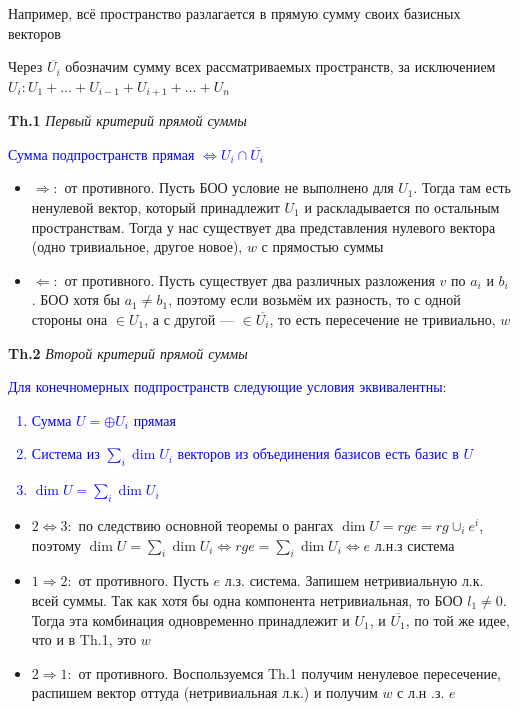 Например, всё пространство разлагается в прямую сумму своих базисных векторов

Через $\overline{U_i}$ обозначим сумму всех рассматриваемых пространств, за исключением $U_i: U_1 + \dots + U_{i-1} +
U_{i+1} + \dots + U_n$

\textbf{Th.1} \textit{Первый критерий прямой суммы}

\textcolor{blue}{Сумма подпространств прямая $\Leftrightarrow U_i \cap \overline{U_i}$}

\begin{itemize}
    \item $\Rightarrow:$ от противного.
    Пусть БОО условие не выполнено для $U_1$.
    Тогда там есть ненулевой вектор, который принадлежит $U_1$ и раскладывается по остальным пространствам.
    Тогда у нас существует два представления нулевого вектора (одно тривиальное, другое новое), $w$ с прямостью суммы
    \item $\Leftarrow:$ от противного.
    Пусть существует два различных разложения $v$ по $a_i$ и $b_i$.
    БОО хотя бы $a_1 \neq b_1$, поэтому если возьмём их разность, то с одной стороны она $\in U_1$, а с другой ---
    $\in \overline{U_i}$, то есть пересечение не тривиально, $w$
\end{itemize}

\textbf{Th.2} \textit{Второй критерий прямой суммы}

\textcolor{blue}{Для конечномерных подпространств следующие условия эквивалентны:
    \begin{enumerate}
        \item Сумма $U = \oplus U_i$ прямая
        \item Система из $\sum_i \dim U_i$ векторов из объединения базисов есть базис в $U$
        \item $\dim U = \sum_i \dim U_i$
    \end{enumerate} }

\begin{itemize}
    \item $2 \Leftrightarrow 3:$ по следствию основной теоремы о рангах $\dim U = rg e = rg \cup_i e^i$, поэтому
    $ \dim U = \sum_i \dim U_i \Leftrightarrow rg e = \sum_i \dim U_i \Leftrightarrow e $ л.н.з система
    \item $1 \Rightarrow 2:$ от противного.
    Пусть $e$ л.з. система.
    Запишем нетривиальную л.к. всей суммы.
    Так как хотя бы одна компонента нетривиальная, то БОО $l_1 \neq 0$.
    Тогда эта комбинация одновременно принадлежит и $U_1$, и $\overline{U_1}$, по той же идее, что и в Th.1, это $w$
    \item $2 \Rightarrow 1:$ от противного.
    Воспользуемся Th.1 получим ненулевое пересечение, распишем вектор оттуда (нетривиальная л.к.) и получим $w$ с л.н
    .з. $e$
\end{itemize}

